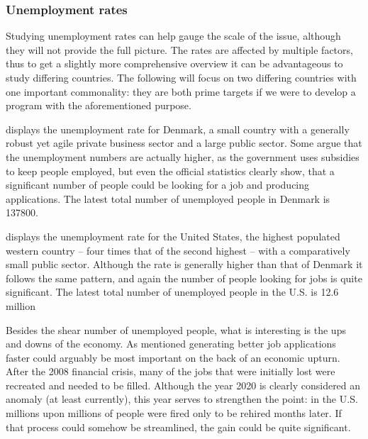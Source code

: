 \subsubsection{Unemployment rates}

Studying unemployment rates can help gauge the scale of the issue, although they
will not provide the full picture. The rates are affected by multiple factors,
thus to get a slightly more comprehensive overview it can be advantageous to
study differing countries. The following will focus on two differing countries
with one important commonality: they are both prime targets if we were to
develop a program with the aforementioned purpose.

 displays the unemployment rate for Denmark, a small country with a
generally robust yet agile private business sector and a large public sector.
Some argue that the unemployment numbers are actually higher, as the government
uses subsidies to keep people employed, but even the official statistics clearly
show, that a significant number of people could be looking for a job and
producing applications.\cite{cepos} The latest total number of unemployed people
in Denmark is 137800.


 displays the unemployment rate for the United States, the highest
populated western country -- four times that of the second highest -- with a
comparatively small public sector. Although the rate is generally higher than
that of Denmark it follows the same pattern, and again the number of people
looking for jobs is quite significant. The latest total number of unemployed
people in the U.S. is 12.6 million


Besides the shear number of unemployed people, what is interesting is the ups
and downs of the economy. As mentioned generating better job applications faster
could arguably be most important on the back of an economic upturn. After the
2008 financial crisis, many of the jobs that were initially lost were recreated
and needed to be filled. Although the year 2020 is clearly considered an anomaly
(at least currently), this year serves to strengthen the point: in the U.S.
millions upon millions of people were fired only to be rehired months later. If
that process could somehow be streamlined, the gain could be quite significant.

